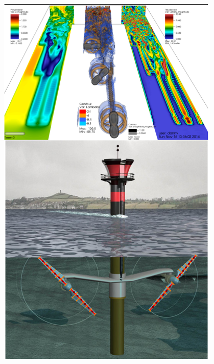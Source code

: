 \documentclass[xcolor=x11names,compress]{beamer}
\renewcommand{\(}{\begin{columns}}
\renewcommand{\)}{\end{columns}}
\newcommand{\<}[1]{\begin{column}{#1}}
\renewcommand{\>}{\end{column}}
\begin{document}
\begin{frame}{}
\begin{columns}
\begin{column}{0.3\textwidth}
        \begin{figure}[p]
		    \centering
		    \includegraphics[width=1.1\textwidth]{figures/LES_and_cartoon_actuator_line.png}
		    \label{fig:cartoon_actuator_line}
		\end{figure}

    \end{column}
    
    \begin{column}{0.875\textwidth}
		

\end{column}
\end{columns}
\end{frame}
\end{document}
